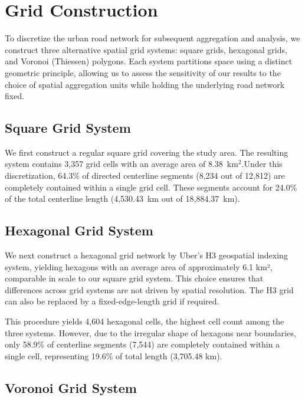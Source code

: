 \documentclass[12pt]{article}
\begin{document}
	\clearpage

	
	
	
	
	
	
	\section{Grid Construction}
	
	To discretize the urban road network for subsequent aggregation and analysis, we construct three alternative spatial grid systems: square grids, hexagonal grids, and Voronoi (Thiessen) polygons. Each system partitions space using a distinct geometric principle, allowing us to assess the sensitivity of our results to the choice of spatial aggregation units while holding the underlying road network fixed.
	
	\subsection{Square Grid System}
	
	We first construct a regular square grid covering the study area. The resulting system contains 3,357 grid cells with an average area of 8.38~km$^2$.Under this discretization, 64.3\% of directed centerline segments (8,234 out of 12,812) are completely contained within a single grid cell. These segments account for 24.0\% of the total centerline length (4,530.43~km out of 18,884.37~km). 
	
	\subsection{Hexagonal Grid System}
	
	We next construct a hexagonal grid network by Uber's H3 geospatial indexing system, yielding hexagons with an average area of approximately 6.1 km², comparable in scale to our square grid system. This choice ensures that differences across grid systems are not driven by spatial resolution. The H3 grid can also be replaced by a fixed-edge-length grid if required.
	
	This procedure yields 4,604 hexagonal cells, the highest cell count among the three systems. However, due to the irregular shape of hexagons near boundaries, only 58.9\% of centerline segments (7,544) are completely contained within a single cell, representing 19.6\% of total length (3,705.48 km).
	
	\subsection{Voronoi Grid System}
	
\end{document}
